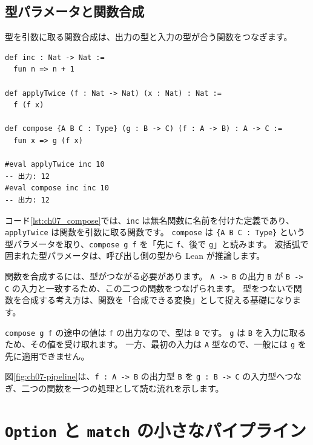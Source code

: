 \subsection{型パラメータと関数合成}

型を引数に取る関数合成は、出力の型と入力の型が合う関数をつなぎます。

\begin{listing}[htbp]
\begin{verbatim}
def inc : Nat -> Nat :=
  fun n => n + 1

def applyTwice (f : Nat -> Nat) (x : Nat) : Nat :=
  f (f x)

def compose {A B C : Type} (g : B -> C) (f : A -> B) : A -> C :=
  fun x => g (f x)

#eval applyTwice inc 10
-- 出力: 12
#eval compose inc inc 10
-- 出力: 12
\end{verbatim}
\caption{\texttt{inc}・\texttt{applyTwice}・\texttt{compose}}
\label{lst:ch07_compose}
\end{listing}

コード\ref{lst:ch07_compose}では、\texttt{inc} は無名関数に名前を付けた定義であり、\texttt{applyTwice} は関数を引数に取る関数です。
\texttt{compose} は \texttt{\{A B C : Type\}} という型パラメータを取り、\texttt{compose g f} を「先に \texttt{f}、後で \texttt{g}」と読みます。
波括弧で囲まれた型パラメータは、呼び出し側の型から Lean が推論します。

関数を合成するには、型がつながる必要があります。
\texttt{A -> B} の出力 \texttt{B} が \texttt{B -> C} の入力と一致するため、この二つの関数をつなげられます。
型をつないで関数を合成する考え方は、関数を「合成できる変換」として捉える基礎になります。

\texttt{compose g f} の途中の値は \texttt{f} の出力なので、型は \texttt{B} です。
\texttt{g} は \texttt{B} を入力に取るため、その値を受け取れます。
一方、最初の入力は \texttt{A} 型なので、一般には \texttt{g} を先に適用できません。

図\ref{fig:ch07-pipeline}は、\texttt{f : A -> B} の出力型 \texttt{B} を \texttt{g : B -> C} の入力型へつなぎ、二つの関数を一つの処理として読む流れを示します。


\section{\texttt{Option} と \texttt{match} の小さなパイプライン}

